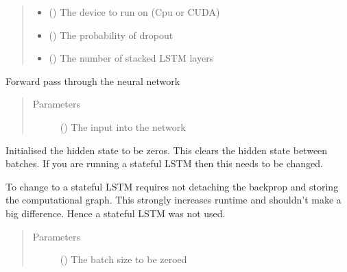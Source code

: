 \documentclass[letterpaper,10pt,english]{sphinxmanual}
\begin{document}
\begin{fulllineitems}
\begin{quote}
\begin{description}
\begin{itemize}
\item {} 
 () \textendash{} The device to run on (Cpu or CUDA)

\item {} 
 () \textendash{} The probability of dropout

\item {} 
 () \textendash{} The number of stacked LSTM layers

\end{itemize}

\end{description}\end{quote}

\begin{fulllineitems}
\label{\detokenize{index:Forecaster.models.LSTM.forward}}
Forward pass through the neural network
\begin{quote}\begin{description}
\item[{Parameters}] \leavevmode
{} () \textendash{} The input into the network

\end{description}\end{quote}

\end{fulllineitems}


\begin{fulllineitems}
\label{\detokenize{index:Forecaster.models.LSTM.init_hidden}}
Initialised the hidden state to be zeros. This clears the hidden
state between batches. If you are running a stateful LSTM then this
needs to be changed.

To change to a stateful LSTM requires not detaching the backprop and
storing the computational graph. This strongly increases runtime and
shouldn’t make a big difference. Hence a stateful LSTM was not used.
\begin{quote}\begin{description}
\item[{Parameters}] \leavevmode
{} () \textendash{} The batch size to be zeroed


\end{description}
\end{quote}
\end{fulllineitems}
\end{fulllineitems}
\end{document}
